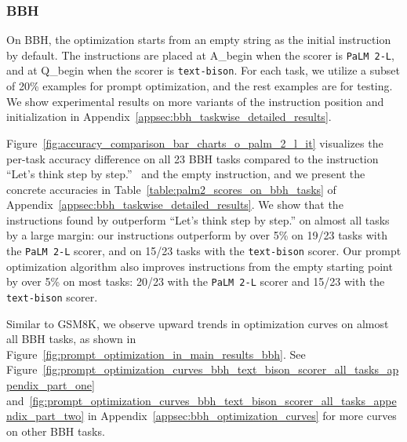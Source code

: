 \subsubsection{BBH}
On BBH, the optimization starts from an empty string as the initial instruction by default. The instructions are placed at A\_begin when the scorer is \texttt{PaLM 2-L}, and at Q\_begin when the scorer is \texttt{text-bison}. For each task, we utilize a subset of 20\% examples for prompt optimization, and the rest examples are for testing. We show experimental results on more variants of the instruction position and initialization in Appendix~\ref{appsec:bbh_taskwise_detailed_results}.

Figure~\ref{fig:accuracy_comparison_bar_charts_o_palm_2_l_it} visualizes the per-task accuracy difference on all 23 BBH tasks compared to the instruction ``Let's think step by step.''~\citep{kojima2022large} and the empty instruction, and we present the concrete accuracies in Table~\ref{table:palm2_scores_on_bbh_tasks} of Appendix~\ref{appsec:bbh_taskwise_detailed_results}. We show that the instructions found by \name{} outperform ``Let's think step by step.'' on almost all tasks by a large margin: our instructions outperform by over 5\% on 19/23 tasks with the \texttt{PaLM 2-L} scorer, and on 15/23 tasks with the \texttt{text-bison} scorer.
Our prompt optimization algorithm also improves instructions from the empty starting point by over 5\% on most tasks: 20/23 with the \texttt{PaLM 2-L} scorer and 15/23 with the \texttt{text-bison} scorer.

Similar to GSM8K, we observe upward trends in optimization curves on almost all BBH tasks, as shown in Figure~\ref{fig:prompt_optimization_in_main_results_bbh}.
See Figure~\ref{fig:prompt_optimization_curves_bbh_text_bison_scorer_all_tasks_appendix_part_one} and~\ref{fig:prompt_optimization_curves_bbh_text_bison_scorer_all_tasks_appendix_part_two} in Appendix~\ref{appsec:bbh_optimization_curves} for more curves on other BBH tasks. 

